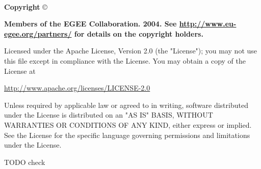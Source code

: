 %
%
%
~

\vfill{}

{\bf
Copyright} \copyright\ {\bf Members of the EGEE Collaboration. 2004.  See
\href{http://www.eu-egee.org/partners/}{http://www.eu-egee.org/partners/} for
details on the copyright holders.  

Licensed under the Apache License, Version 2.0 (the "License"); you may not use
this file except in compliance with the License.  You may obtain a copy of the
License at 

\begin{center}
\href{http://www.apache.org/licenses/LICENSE-2.0}{http://www.apache.org/licenses/LICENSE-2.0}
\end{center}

Unless required by applicable law or agreed to in writing, software distributed
under the License is distributed on an "AS IS" BASIS, WITHOUT WARRANTIES OR
CONDITIONS OF ANY KIND, either express or implied.  See the License for the
specific language governing permissions and limitations under the License.
}
\clearpage

TODO check
